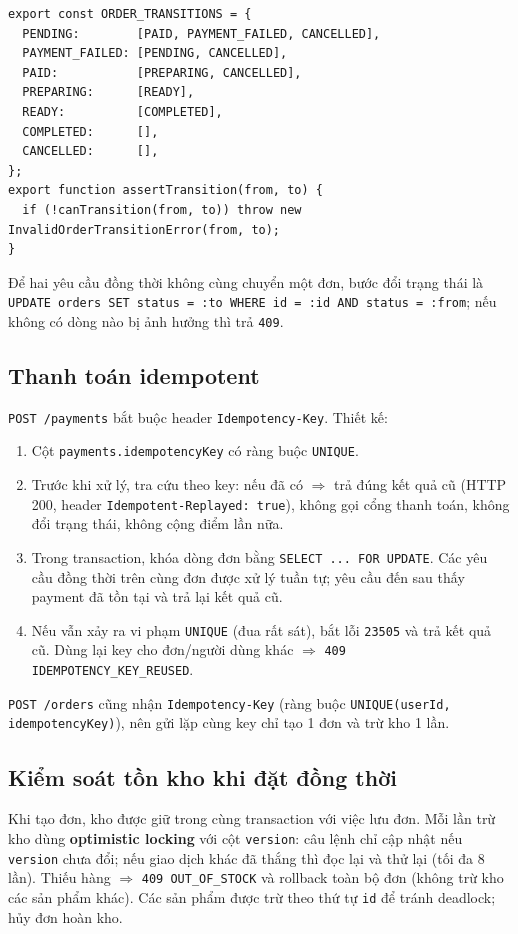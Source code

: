 \documentclass[a4paper]{article}
\begin{document}
\begin{lstlisting}[caption={Bảng chuyển trạng thái hợp lệ (order-status.ts)}]
export const ORDER_TRANSITIONS = {
  PENDING:        [PAID, PAYMENT_FAILED, CANCELLED],
  PAYMENT_FAILED: [PENDING, CANCELLED],
  PAID:           [PREPARING, CANCELLED],
  PREPARING:      [READY],
  READY:          [COMPLETED],
  COMPLETED:      [],
  CANCELLED:      [],
};
export function assertTransition(from, to) {
  if (!canTransition(from, to)) throw new InvalidOrderTransitionError(from, to);
}
\end{lstlisting}
Để hai yêu cầu đồng thời không cùng chuyển một đơn, bước đổi trạng thái là \texttt{UPDATE orders SET status = :to WHERE id = :id AND status = :from}; nếu không có dòng nào bị ảnh hưởng thì trả \texttt{409}.

\subsection{Thanh toán idempotent}
\texttt{POST /payments} bắt buộc header \texttt{Idempotency-Key}. Thiết kế:
\begin{enumerate}
  \item Cột \texttt{payments.idempotencyKey} có ràng buộc \texttt{UNIQUE}.
  \item Trước khi xử lý, tra cứu theo key: nếu đã có $\Rightarrow$ trả đúng kết quả cũ (HTTP 200, header \texttt{Idempotent-Replayed: true}), không gọi cổng thanh toán, không đổi trạng thái, không cộng điểm lần nữa.
  \item Trong transaction, khóa dòng đơn bằng \texttt{SELECT ... FOR UPDATE}. Các yêu cầu đồng thời trên cùng đơn được xử lý tuần tự; yêu cầu đến sau thấy payment đã tồn tại và trả lại kết quả cũ.
  \item Nếu vẫn xảy ra vi phạm \texttt{UNIQUE} (đua rất sát), bắt lỗi \texttt{23505} và trả kết quả cũ. Dùng lại key cho đơn/người dùng khác $\Rightarrow$ \texttt{409 IDEMPOTENCY\_KEY\_REUSED}.
\end{enumerate}
\texttt{POST /orders} cũng nhận \texttt{Idempotency-Key} (ràng buộc \texttt{UNIQUE(userId, idempotencyKey)}), nên gửi lặp cùng key chỉ tạo 1 đơn và trừ kho 1 lần.

\subsection{Kiểm soát tồn kho khi đặt đồng thời}
Khi tạo đơn, kho được giữ trong cùng transaction với việc lưu đơn. Mỗi lần trừ kho dùng \textbf{optimistic locking} với cột \texttt{version}: câu lệnh chỉ cập nhật nếu \texttt{version} chưa đổi; nếu giao dịch khác đã thắng thì đọc lại và thử lại (tối đa 8 lần). Thiếu hàng $\Rightarrow$ \texttt{409 OUT\_OF\_STOCK} và rollback toàn bộ đơn (không trừ kho các sản phẩm khác). Các sản phẩm được trừ theo thứ tự \texttt{id} để tránh deadlock; hủy đơn hoàn kho.
\end{document}
